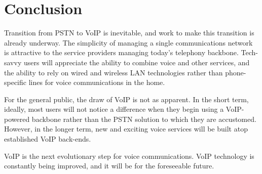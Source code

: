 \documentclass[11pt]{article}
\begin{document}
\section{Conclusion}

Transition from PSTN to VoIP is inevitable, and work to make this transition is
already underway. The simplicity of managing a single communications network is
attractive to the service providers managing today's telephony backbone.
Tech-savvy users will appreciate the ability to combine voice and other
services, and the ability to rely on wired and wireless LAN technologies rather
than phone-specific lines for voice communications in the home.

For the general public, the draw of VoIP is not as apparent. In the short term,
ideally, most users will not notice a difference when they begin using a
VoIP-powered backbone rather than the PSTN solution to which they are
accustomed. However, in the longer term, new and exciting voice services will be
built atop established VoIP back-ends.

VoIP is the next evolutionary step for voice communications. VoIP technology is
constantly being improved, and it will be for the foreseeable future.

\printbibliography
\end{document}
